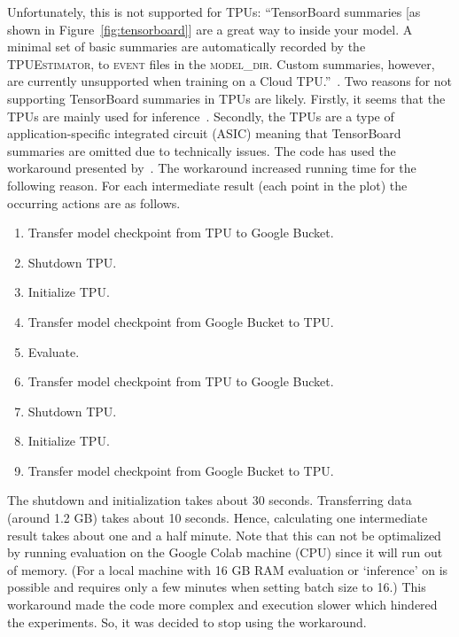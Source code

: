 Unfortunately, this is not supported for TPUs:
``TensorBoard summaries [as shown in Figure~\ref{fig:tensorboard}] are a great way to inside your model.
A minimal set of basic summaries are automatically recorded by the \textsc{TPUEstimator}, to \textsc{event} files in the \textsc{model\_dir}.
Custom summaries, however, are currently unsupported when training on a Cloud TPU.''~\citep{google2019tpu}.
Two reasons for not supporting TensorBoard summaries in TPUs are likely.
Firstly, it seems that the TPUs are mainly used for inference~\citep{lakshmanan2018tpu}.
Secondly, the TPUs are a type of application-specific integrated circuit (ASIC) meaning that TensorBoard summaries are omitted due to technically issues.
The code has used the workaround presented by~\citet{lakshmanan2018tpu}.
The workaround increased running time for the following reason.
For each intermediate result (each point in the plot) the occurring actions are as follows.
\begin{enumerate}
    \item Transfer model checkpoint from TPU to Google Bucket.
    \item Shutdown TPU.
    \item Initialize TPU.
    \item Transfer model checkpoint from Google Bucket to TPU.
    \item Evaluate.
    \item Transfer model checkpoint from TPU to Google Bucket.
    \item Shutdown TPU.
    \item Initialize TPU.
    \item Transfer model checkpoint from Google Bucket to TPU.
\end{enumerate}
The shutdown and initialization takes about 30 seconds.
Transferring data (around 1.2 GB) takes about 10 seconds.
Hence, calculating one intermediate result takes about one and a half minute.
Note that this can not be optimalized by running evaluation on the Google Colab machine (CPU) since it will run out of memory.
(For a local machine with 16 GB RAM evaluation or `inference' on  is possible and requires only a few minutes when setting batch size to 16.)
This workaround made the code more complex and execution slower which hindered the experiments.
So, it was decided to stop using the workaround.


